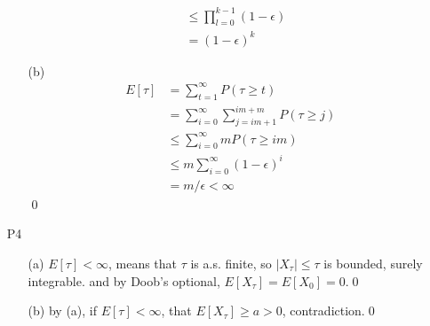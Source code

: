 \documentclass[paper=a4, fontsize=11pt]{scrartcl} %
\numberwithin{equation}{section} %
\numberwithin{figure}{section} %
\numberwithin{table}{section} %
\begin{document}
\begin{itemize}
\begin{itemize}
\begin{align}
				&\leq \prod_{l=0}^{k-1} (1-\epsilon)\\
				&= (1-\epsilon)^k
		\end{align}
		\item[(b)]
		\begin{align}
			E[\tau] &= \sum_{t=1}^\infty P(\tau \geq t)\\
				&= \sum_{i=0}^{\infty} \sum_{j=im+1}^{im+m} P(\tau\geq j)\\
				&\leq \sum_{i=0}^{\infty} mP(\tau\geq im)\\
				&\leq m \sum_{i=0}^{\infty} (1-\epsilon)^i \\
				&= m/\epsilon < \infty
		\end{align}\qed
	\end{itemize}
	\item[P4]
	\begin{itemize}
		\item[(a)] $E[\tau]<\infty$, means that $\tau$ is a.s. finite, so $|X_\tau|\leq \tau$ is bounded, surely integrable. and by Doob's optional, $E[X_\tau]=E[X_0] = 0$.\qed
		\item[(b)] by (a), if $E[\tau]<\infty$, that $E[X_\tau]\geq a >0$, contradiction.\qed
	\end{itemize}
\end{itemize}
\end{document}
